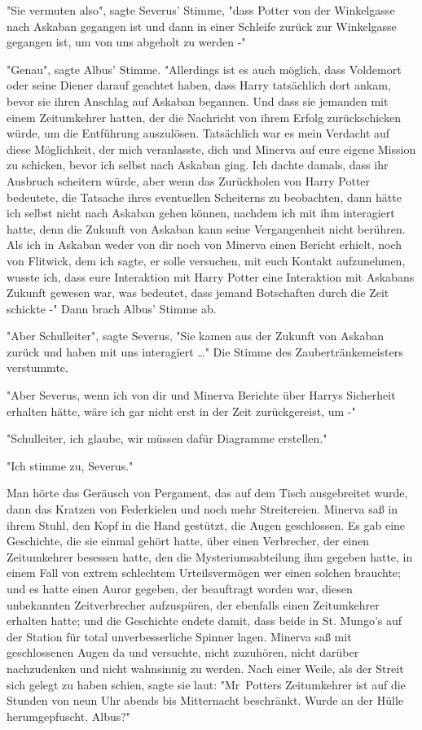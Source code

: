 {"Sie vermuten also", sagte Severus' Stimme, "dass Potter von der Winkelgasse nach Askaban gegangen ist und dann in einer Schleife zurück zur Winkelgasse gegangen ist, um von uns abgeholt zu werden -"

"Genau", sagte Albus' Stimme. "Allerdings ist es auch möglich, dass Voldemort oder seine Diener darauf geachtet haben, dass Harry tatsächlich dort ankam, bevor sie ihren Anschlag auf Askaban begannen. Und dass sie jemanden mit einem Zeitumkehrer hatten, der die Nachricht von ihrem Erfolg zurückschicken würde, um die Entführung auszulösen. Tatsächlich war es mein Verdacht auf diese Möglichkeit, der mich veranlasste, dich und Minerva auf eure eigene Mission zu schicken, bevor ich selbst nach Askaban ging. Ich dachte damals, dass ihr Ausbruch scheitern würde, aber wenn das Zurückholen von Harry Potter bedeutete, die Tatsache ihres eventuellen Scheiterns zu beobachten, dann hätte ich selbst nicht nach Askaban gehen können, nachdem ich mit ihm interagiert hatte, denn die Zukunft von Askaban kann seine Vergangenheit nicht berühren. Als ich in Askaban weder von dir noch von Minerva einen Bericht erhielt, noch von Flitwick, dem ich sagte, er solle versuchen, mit euch Kontakt aufzunehmen, wusste ich, dass eure Interaktion mit Harry Potter eine Interaktion mit Askabans Zukunft gewesen war, was bedeutet, dass jemand Botschaften durch die Zeit schickte -" Dann brach Albus' Stimme ab.

"Aber Schulleiter", sagte Severus, "Sie kamen aus der Zukunft von Askaban zurück und haben mit uns interagiert …" Die Stimme des Zaubertränkemeisters verstummte.

"Aber Severus, wenn ich von dir und Minerva Berichte über Harrys Sicherheit erhalten hätte, wäre ich gar nicht erst in der Zeit zurückgereist, um -"

"Schulleiter, ich glaube, wir müssen dafür Diagramme erstellen."

"Ich stimme zu, Severus."

Man hörte das Geräusch von Pergament, das auf dem Tisch ausgebreitet wurde, dann das Kratzen von Federkielen und noch mehr Streitereien. Minerva saß in ihrem Stuhl, den Kopf in die Hand gestützt, die Augen geschlossen. Es gab eine Geschichte, die sie einmal gehört hatte, über einen Verbrecher, der einen Zeitumkehrer besessen hatte, den die Mysteriumsabteilung ihm gegeben hatte, in einem Fall von extrem schlechtem Urteilsvermögen wer einen solchen brauchte; und es hatte einen Auror gegeben, der beauftragt worden war, diesen unbekannten Zeitverbrecher aufzuspüren, der ebenfalls einen Zeitumkehrer erhalten hatte; und die Geschichte endete damit, dass beide in St. Mungo's auf der Station für total unverbesserliche Spinner lagen. Minerva saß mit geschlossenen Augen da und versuchte, nicht zuzuhören, nicht darüber nachzudenken und nicht wahnsinnig zu werden. Nach einer Weile, als der Streit sich gelegt zu haben schien, sagte sie laut: "Mr~Potters Zeitumkehrer ist auf die Stunden von neun Uhr abends bis Mitternacht beschränkt. Wurde an der Hülle herumgepfuscht, Albus?"

}
